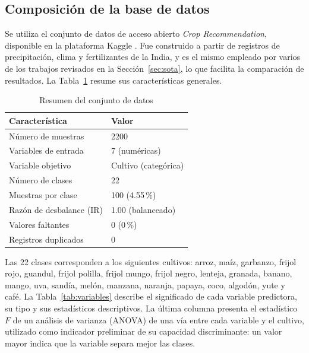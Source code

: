 \documentclass[conference]{IEEEtran}
\begin{document}
\subsection{Composición de la base de datos}

Se utiliza el conjunto de datos de acceso abierto \emph{Crop Recommendation}, disponible en la plataforma Kaggle \cite{kumar_dataset}. Fue construido a partir de registros de precipitación, clima y fertilizantes de la India, y es el mismo empleado por varios de los trabajos revisados en la Sección~\ref{sec:sota}, lo que facilita la comparación de resultados. La Tabla~\ref{tab:resumen} resume sus características generales.

\begin{table}[htbp]
\caption{Resumen del conjunto de datos}
\label{tab:resumen}
\centering
\begin{tabular}{ll}
\toprule
\textbf{Característica} & \textbf{Valor} \\
\midrule
Número de muestras & 2200 \\
Variables de entrada & 7 (numéricas) \\
Variable objetivo & Cultivo (categórica) \\
Número de clases & 22 \\
Muestras por clase & 100 (4.55\,\%) \\
Razón de desbalance (IR) & 1.00 (balanceado) \\
Valores faltantes & 0 (0\,\%) \\
Registros duplicados & 0 \\
\bottomrule
\end{tabular}
\end{table}

Las 22 clases corresponden a los siguientes cultivos: arroz, maíz, garbanzo, frijol rojo, guandul, frijol polilla, frijol mungo, frijol negro, lenteja, granada, banano, mango, uva, sandía, melón, manzana, naranja, papaya, coco, algodón, yute y café. La Tabla~\ref{tab:variables} describe el significado de cada variable predictora, su tipo y sus estadísticos descriptivos. La última columna presenta el estadístico $F$ de un análisis de varianza (ANOVA) de una vía entre cada variable y el cultivo, utilizado como indicador preliminar de su capacidad discriminante: un valor mayor indica que la variable separa mejor las clases.
\end{document}
